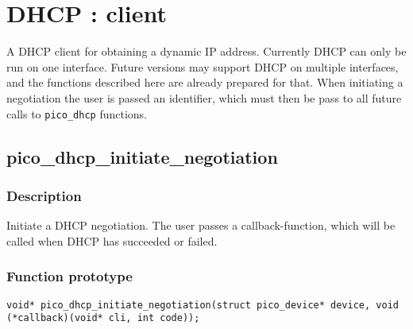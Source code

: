 \section{DHCP : client}

A DHCP client for obtaining a dynamic IP address.
Currently DHCP can only be run on one interface. Future versions may support DHCP on multiple interfaces, and the functions described here are already prepared for that.
When initiating a negotiation the user is passed an identifier, which must then be pass to all future calls to \texttt{pico\_dhcp} functions.


\subsection{pico\_dhcp\_initiate\_negotiation}

\subsubsection*{Description}
Initiate a DHCP negotiation. The user passes a callback-function, which will be called when DHCP has succeeded or failed.

\subsubsection*{Function prototype}
\texttt{void* pico\_dhcp\_initiate\_negotiation(struct pico\_device* device, void (*callback)(void* cli, int code));}


